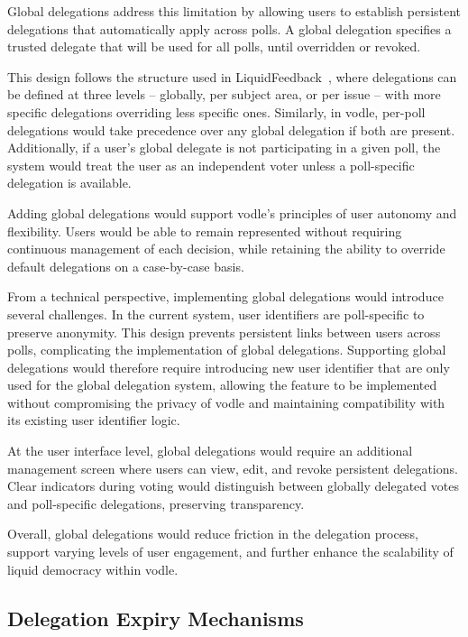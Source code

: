 Global delegations address this limitation by allowing users to establish persistent delegations that automatically apply across polls. A global delegation specifies a trusted delegate that will be used for all polls, until overridden or revoked.

This design follows the structure used in LiquidFeedback~\citep{behrens_liquidfeedback_2014}, where delegations can be defined at three levels -- globally, per subject area, or per issue -- with more specific delegations overriding less specific ones. Similarly, in vodle, per-poll delegations would take precedence over any global delegation if both are present. Additionally, if a user's global delegate is not participating in a given poll, the system would treat the user as an independent voter unless a poll-specific delegation is available.

Adding global delegations would support vodle's principles of user autonomy and flexibility. Users would be able to remain represented without requiring continuous management of each decision, while retaining the ability to override default delegations on a case-by-case basis.

From a technical perspective, implementing global delegations would introduce several challenges. In the current system, user identifiers are poll-specific to preserve anonymity. This design prevents persistent links between users across polls, complicating the implementation of global delegations. Supporting global delegations would therefore require introducing new user identifier that are only used for the global delegation system, allowing the feature to be implemented without compromising the privacy of vodle and maintaining compatibility with its existing user identifier logic.

At the user interface level, global delegations would require an additional management screen where users can view, edit, and revoke persistent delegations. Clear indicators during voting would distinguish between globally delegated votes and poll-specific delegations, preserving transparency.

Overall, global delegations would reduce friction in the delegation process, support varying levels of user engagement, and further enhance the scalability of liquid democracy within vodle.

\subsection{Delegation Expiry Mechanisms}

